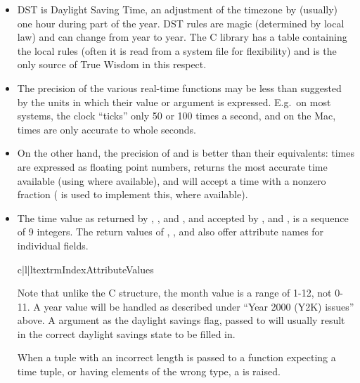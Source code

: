 \begin{itemize}
\item
DST is Daylight Saving Time, an adjustment
of the timezone by (usually) one hour during part of the year.  DST
rules are magic (determined by local law) and can change from year to
year.  The C library has a table containing the local rules (often it
is read from a system file for flexibility) and is the only source of
True Wisdom in this respect.

\item
The precision of the various real-time functions may be less than
suggested by the units in which their value or argument is expressed.
E.g.\ on most \UNIX{} systems, the clock ``ticks'' only 50 or 100 times a
second, and on the Mac, times are only accurate to whole seconds.

\item
On the other hand, the precision of  and
 is better than their \UNIX{} equivalents: times are
expressed as floating point numbers,  returns the
most accurate time available (using \UNIX{} 
where available), and  will accept a time with a
nonzero fraction (\UNIX{}  is used to implement
this, where available).

\item
The time value as returned by ,
, and , and accepted by
,  and ,
is a sequence of 9 integers.  The return values of ,
, and  also offer attribute
names for individual fields.

\begin{tableiii}{c|l|l}{textrm}{Index}{Attribute}{Values}
\end{tableiii}

Note that unlike the C structure, the month value is a
range of 1-12, not 0-11.  A year value will be handled as described
under ``Year 2000 (Y2K) issues'' above.  A  argument as the
daylight savings flag, passed to  will usually
result in the correct daylight savings state to be filled in.

When a tuple with an incorrect length is passed to a function
expecting a time tuple, or having elements of the wrong type, a
 is raised.

\end{itemize}

